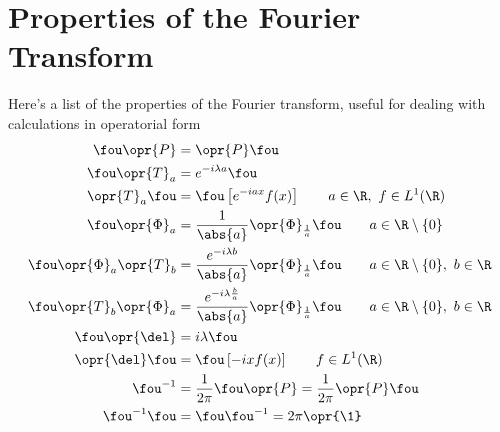 \documentclass[../mmf.tex]{subfiles}
\begin{document}
\section{Properties of the Fourier Transform}
Here's a list of the properties of the Fourier transform, useful for dealing with calculations in operatorial form
\begin{equation}
	\begin{aligned}
		\fou\opr{P}&=\opr{P}\fou\\
		\fou\opr{T}_a&=e^{-i\lambda a}\fou\\
		\opr{T}_a\fou&=\fou\left[ e^{-iax}f(x) \right]\qquad a\in\R,\ f\in L^1(\R)\\
		\fou\opr{\Phi}_a&=\frac{1}{\abs{a}}\opr{\Phi}_{\frac{1}{a}}\fou\qquad a\in\R\setminus\{0\}\\
		\fou\opr{\Phi}_a\opr{T}_b&=\frac{e^{-i\lambda b}}{\abs{a}}\opr{\Phi}_{\frac{1}{a}}\fou\qquad a\in\R\setminus\{0\},\ b\in\R\\
		\fou\opr{T}_b\opr{\Phi}_a&=\frac{e^{-i\lambda\frac{b}{a}}}{\abs{a}}\opr{\Phi}_{\frac{1}{a}}\fou\qquad a\in\R\setminus\{0\},\ b\in\R\\
		\fou\opr{\del}&=i\lambda\fou\\
		\opr{\del}\fou&=\fou\left[ -ixf(x) \right]\qquad f\in L^1(\R)\\
		\fou^{-1}&=\frac{1}{2\pi}\fou\opr{P}=\frac{1}{2\pi}\opr{P}\fou\\
		\fou^{-1}\fou&=\fou\fou^{-1}=2\pi\opr{\1}
	\end{aligned}
	\label{eq:fouriertranspropcomp}
\end{equation}
\end{document}
